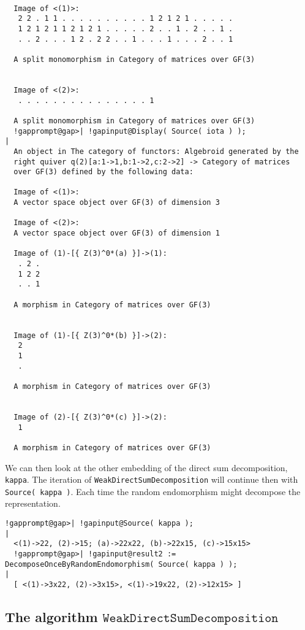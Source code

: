 \begin{computation}
\begin{Verbatim}[commandchars=!@|,fontsize=\small,frame=single,label=Example]
  
  Image of <(1)>:
   2 2 . 1 1 . . . . . . . . . . 1 2 1 2 1 . . . . .
   1 2 1 2 1 1 2 1 2 1 . . . . . 2 . . 1 . 2 . . 1 .
   . . 2 . . . 1 2 . 2 2 . . 1 . . . 1 . . . 2 . . 1
  
  A split monomorphism in Category of matrices over GF(3)
  
  
  Image of <(2)>:
   . . . . . . . . . . . . . . . 1
  
  A split monomorphism in Category of matrices over GF(3)
  !gapprompt@gap>| !gapinput@Display( Source( iota ) );
|
  An object in The category of functors: Algebroid generated by the
  right quiver q(2)[a:1->1,b:1->2,c:2->2] -> Category of matrices
  over GF(3) defined by the following data:
  
  Image of <(1)>:
  A vector space object over GF(3) of dimension 3
  
  Image of <(2)>:
  A vector space object over GF(3) of dimension 1
  
  Image of (1)-[{ Z(3)^0*(a) }]->(1):
   . 2 .
   1 2 2
   . . 1
  
  A morphism in Category of matrices over GF(3)
  
  
  Image of (1)-[{ Z(3)^0*(b) }]->(2):
   2
   1
   .
  
  A morphism in Category of matrices over GF(3)
  
  
  Image of (2)-[{ Z(3)^0*(c) }]->(2):
   1
  
  A morphism in Category of matrices over GF(3)
\end{Verbatim}
 We can then look at the other embedding of the direct sum decomposition, \texttt{kappa}. The iteration of \texttt{WeakDirectSumDecomposition} will continue then with \texttt{Source( kappa )}. Each time the random endomorphism might decompose the representation.
\begin{Verbatim}[commandchars=!@|,fontsize=\small,frame=single,label=Example]
  !gapprompt@gap>| !gapinput@Source( kappa );
|
  <(1)->22, (2)->15; (a)->22x22, (b)->22x15, (c)->15x15>
  !gapprompt@gap>| !gapinput@result2 := DecomposeOnceByRandomEndomorphism( Source( kappa ) );
|
  [ <(1)->3x22, (2)->3x15>, <(1)->19x22, (2)->12x15> ]
\end{Verbatim}

\end{computation}


\subsection{The algorithm $\mathtt{WeakDirectSumDecomposition}$}

